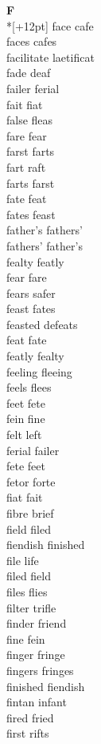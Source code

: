 \vspace{14pt}
\noindent\textbf{\Large F}\\*[+12pt]
face cafe\\
faces cafes\\
facilitate laetificat\\
fade deaf\\
failer ferial\\
fait fiat\\
false fleas\\
fare fear\\
farst farts\\
fart raft\\
farts farst\\
fate feat\\
fates feast\\
father's fathers'\\
fathers' father's\\
fealty featly\\
fear fare\\
fears safer\\
feast fates\\
feasted defeats\\
feat fate\\
featly fealty\\
feeling fleeing\\
feels flees\\
feet fete\\
fein fine\\
felt left\\
ferial failer\\
fete feet\\
fetor forte\\
fiat fait\\
fibre brief\\
field filed\\
fiendish finished\\
file life\\
filed field\\
files flies\\
filter trifle\\
finder friend\\
fine fein\\
finger fringe\\
fingers fringes\\
finished fiendish\\
fintan infant\\
fired fried\\
first rifts\\
